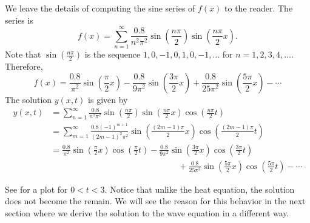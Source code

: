 \begin{example}
We leave the details of computing the sine series of $f(x)$
to the reader.  The series is
\begin{equation*}
f(x) = \sum_{n=1}^\infty
\frac{0.8}{n^2 \pi^2}
\sin \left( \frac{n \pi}{2} \right)
\sin \left( \frac{n \pi}{2} x \right) .
\end{equation*}
Note that 
$\sin \left( \frac{n \pi}{2} \right)$
is the sequence $1, 0, -1, 0, 1, 0, -1, \ldots$
for $n = 1,2,3,4,\ldots$.  Therefore,
\begin{equation*}
f(x) = 
\frac{0.8}{\pi^2}
\sin \left( \frac{\pi}{2} x \right)
-
\frac{0.8}{9 \pi^2}
\sin \left( \frac{3 \pi}{2} x \right)
+
\frac{0.8}{25 \pi^2}
\sin \left( \frac{5 \pi}{2} x \right)
- \cdots
\end{equation*}
The solution $y(x,t)$ is given by
\begin{equation*}
\begin{split}
y(x,t) & = 
\sum_{n=1}^\infty
\frac{0.8}{n^2 \pi^2}
\sin \left( \frac{n \pi}{2} \right)
\sin \left( \frac{n \pi}{2} x \right)
\cos \left( \frac{n \pi}{2} t \right)
\\
& = 
\sum_{m=1}^\infty
\frac{0.8 {(-1)}^{m+1}}{{(2m-1)}^2 \pi^2}
\sin \left( \frac{(2m-1) \pi}{2} x \right)
\cos \left( \frac{(2m-1) \pi}{2} t \right)
\\
& =
\frac{0.8}{\pi^2} 
\sin \left( \frac{\pi}{2}  x \right)
\cos \left( \frac{\pi}{2}  t \right)
-
\frac{0.8}{9 \pi^2} 
\sin \left( \frac{3 \pi}{2}  x \right)
\cos \left( \frac{3 \pi}{2}  t \right)
\\
& \hspace{15em}
+
\frac{0.8}{25 \pi^2}
\sin \left( \frac{5 \pi}{2}  x \right)
\cos \left( \frac{5 \pi}{2}  t \right) 
- \cdots
\end{split}
\end{equation*}

See 
 for a plot
for $0 < t < 3$.  Notice
that unlike the heat equation, the solution does not become
the  remain.  We will see the reason for this behavior in the
next section where we derive the solution to the wave equation in a different
way.

\begin{myfig}
\capstart
{}
\caption{Shape of the plucked string for $0 < t < 3$.\label{wave:pluckedexfig}}
\end{myfig}


\end{example}
